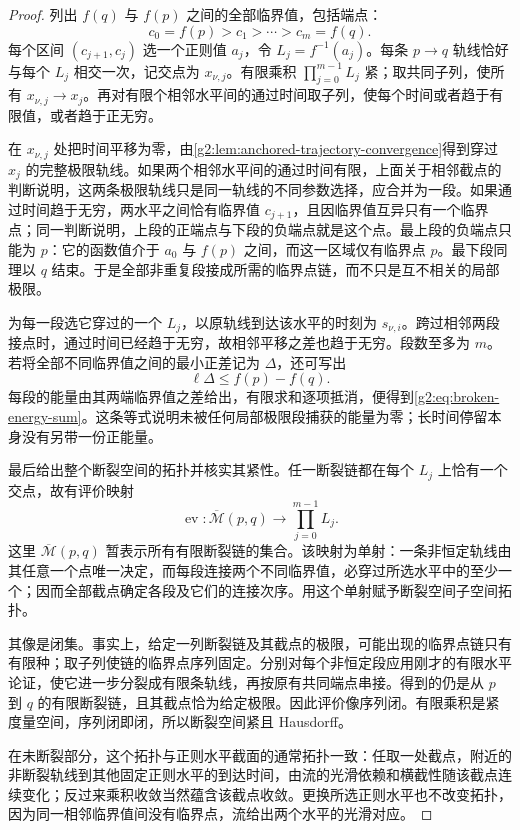 \begin{proof}
	列出 \(f(q)\) 与 \(f(p)\) 之间的全部临界值，包括端点：
	\[
		c_0=f(p)>c_1>\cdots>c_m=f(q).
	\]
	每个区间 \((c_{j+1},c_j)\) 选一个正则值 \(a_j\)，令 \(L_j=f^{-1}(a_j)\)。每条 \(p\to q\) 轨线恰好与每个 \(L_j\) 相交一次，记交点为 \(x_{\nu,j}\)。有限乘积 \(\prod_{j=0}^{m-1}L_j\) 紧；取共同子列，使所有 \(x_{\nu,j}\to x_j\)。再对有限个相邻水平间的通过时间取子列，使每个时间或者趋于有限值，或者趋于正无穷。

	在 \(x_{\nu,j}\) 处把时间平移为零，由\cref{g2:lem:anchored-trajectory-convergence}得到穿过 \(x_j\) 的完整极限轨线。如果两个相邻水平间的通过时间有限，上面关于相邻截点的判断说明，这两条极限轨线只是同一轨线的不同参数选择，应合并为一段。如果通过时间趋于无穷，两水平之间恰有临界值 \(c_{j+1}\)，且因临界值互异只有一个临界点；同一判断说明，上段的正端点与下段的负端点就是这个点。最上段的负端点只能为 \(p\)：它的函数值介于 \(a_0\) 与 \(f(p)\) 之间，而这一区域仅有临界点 \(p\)。最下段同理以 \(q\) 结束。于是全部非重复段接成所需的临界点链，而不只是互不相关的局部极限。

	为每一段选它穿过的一个 \(L_j\)，以原轨线到达该水平的时刻为 \(s_{\nu,i}\)。跨过相邻两段接点时，通过时间已经趋于无穷，故相邻平移之差也趋于无穷。段数至多为 \(m\)。若将全部不同临界值之间的最小正差记为 \(\Delta\)，还可写出
	\[
		\ell\Delta\le f(p)-f(q).
	\]
	每段的能量由其两端临界值之差给出，有限求和逐项抵消，便得到\eqref{g2:eq:broken-energy-sum}。这条等式说明未被任何局部极限段捕获的能量为零；长时间停留本身没有另带一份正能量。

	最后给出整个断裂空间的拓扑并核实其紧性。任一断裂链都在每个 \(L_j\) 上恰有一个交点，故有评价映射
	\[
		\operatorname{ev}:\overline{\mathcal M}(p,q)
		\longrightarrow\prod_{j=0}^{m-1}L_j.
	\]
	这里 \(\overline{\mathcal M}(p,q)\) 暂表示所有有限断裂链的集合。该映射为单射：一条非恒定轨线由其任意一个点唯一决定，而每段连接两个不同临界值，必穿过所选水平中的至少一个；因而全部截点确定各段及它们的连接次序。用这个单射赋予断裂空间子空间拓扑。

	其像是闭集。事实上，给定一列断裂链及其截点的极限，可能出现的临界点链只有有限种；取子列使链的临界点序列固定。分别对每个非恒定段应用刚才的有限水平论证，使它进一步分裂成有限条轨线，再按原有共同端点串接。得到的仍是从 \(p\) 到 \(q\) 的有限断裂链，且其截点恰为给定极限。因此评价像序列闭。有限乘积是紧度量空间，序列闭即闭，所以断裂空间紧且 Hausdorff。

	在未断裂部分，这个拓扑与正则水平截面的通常拓扑一致：任取一处截点，附近的非断裂轨线到其他固定正则水平的到达时间，由流的光滑依赖和横截性随该截点连续变化；反过来乘积收敛当然蕴含该截点收敛。更换所选正则水平也不改变拓扑，因为同一相邻临界值间没有临界点，流给出两个水平的光滑对应。
\end{proof}

